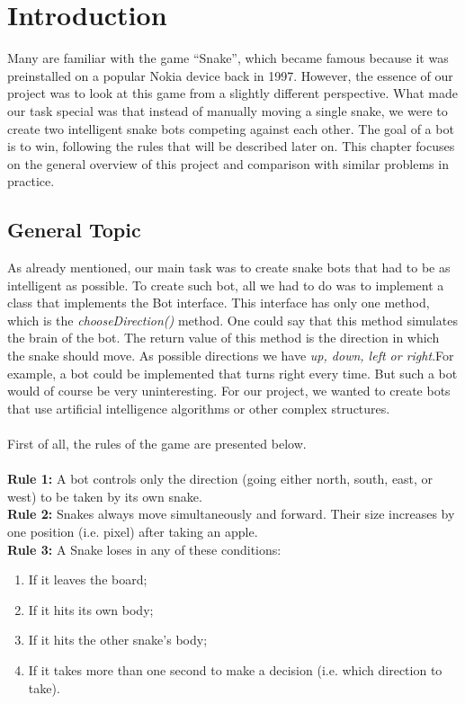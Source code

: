 \documentclass[a4paper,12pt]{article}
\begin{document}
\section{Introduction}
Many are familiar with the game “Snake”, which became famous because it was preinstalled on a popular Nokia device back in 1997.\cite{nokia}
However, the essence of our project was to look at this game from a slightly different perspective. 
What made our task special was that instead of manually moving a single snake, we were to create two intelligent snake bots competing against each other.
The goal of a bot is to win, following the rules that will be described later on.
This chapter focuses on the general overview of this project and comparison with similar problems in practice.
\subsection{General Topic}
As already mentioned, our main task was to create snake bots that had to be as intelligent as possible. To create such bot, all we had to do was to implement a class that implements the Bot interface. This interface has only one method, which is the \textit{chooseDirection()} method. One could say that this method simulates the brain of the bot. The return value of this method is the direction in which the snake should move. As possible directions we have \textit{up, down, left or right}.For example, a bot could be implemented that turns right every time. But such a bot would of course be very uninteresting. For our project, we wanted to create bots that use artificial intelligence algorithms or other complex structures. \\ \\First of all, the rules of the game are presented below.\\
\\
\textbf{Rule 1:}  A bot controls only the direction (going either north, south, east, or west) to
be taken by its own snake.\\
\textbf{Rule 2:} Snakes always move simultaneously and forward. Their size increases by one position
(i.e. pixel) after taking an apple.\\
\textbf{Rule 3:} A Snake loses in any of these conditions:\\
\begin{enumerate}
\item If it leaves the board;
\item If it hits its own body;
\item If it hits the other snake's body;
\item If it takes more than one second to make a decision (i.e. which direction to take).
\end{enumerate}
\end{document}
